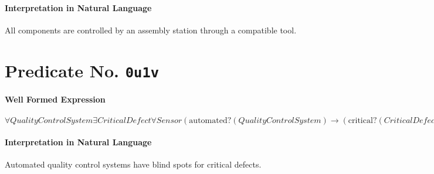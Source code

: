 \documentclass[11pt]{article}
\begin{document}
\paragraph*{Interpretation in Natural Language}
\label{sec:org2ac608e}

All components are controlled by an assembly station through a compatible tool.



\section{Predicate No. \texttt{0u1v}}
\label{sec:org6f4361b}

\paragraph*{Well Formed Expression}
\label{sec:org68a6d25}

\(\forall \mathit{QualityControlSystem} \exists \mathit{CriticalDefect} \forall \mathit{Sensor} (\mathrm{automated?}(\mathit{QualityControlSystem}) \rightarrow (\mathrm{critical?}(\mathit{CriticalDefect}) \land \neg \mathrm{detects?}(\mathit{Sensor}, \mathit{CriticalDefect})))\)

\paragraph*{Interpretation in Natural Language}
\label{sec:org2c407de}

Automated quality control systems have blind spots for critical defects.
\end{document}
